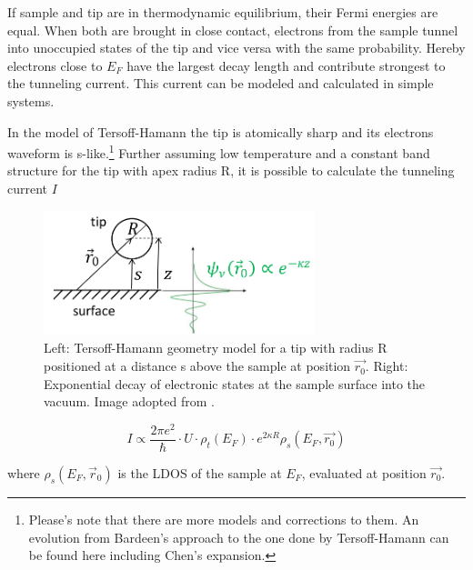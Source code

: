 If sample and tip are in thermodynamic equilibrium, their Fermi energies are equal.
When both are brought in close contact, electrons from the sample tunnel into unoccupied states of the tip and vice versa with the same probability. Hereby electrons close to $E_F$ have the largest decay length 
and contribute strongest to the tunneling current. This current can be modeled and calculated in simple systems. 

In the model of Tersoff-Hamann the tip is atomically sharp and its electrons waveform is s-like.\footnote{Please's note that there are more models and corrections to them. An evolution from Bardeen's approach to the one done by Tersoff-Hamann can be found here \cite{lounis_theory_2014, wortmann_interpretation_2000} including Chen's expansion.} Further assuming low temperature and a constant band structure for the tip with apex radius R, it is possible to calculate the tunneling current $I$

\begin{figure}\centering
	\includegraphics[width=0.7\textwidth]{./images/TH-tip-model}
	\caption{Left: Tersoff-Hamann geometry model for a tip with radius R  positioned at a distance s above the sample at position $\vec{r_0}$. Right: Exponential decay of electronic states at the sample surface into the vacuum. Image adopted from \cite{STM_theory_versuch_temirov}.}
	\label{fig:STM-TH_model}
\end{figure}

$$I \propto \frac{2 \pi e^2}{\hbar} \cdot U \cdot \rho_t(E_F) \cdot e^{2\kappa R} \rho_s(E_F,\vec{ r_0})$$

where $\rho_s(E_F,\vec r_0)$ is the LDOS of the sample at $E_F$, evaluated at position $\vec{r_0}$.


